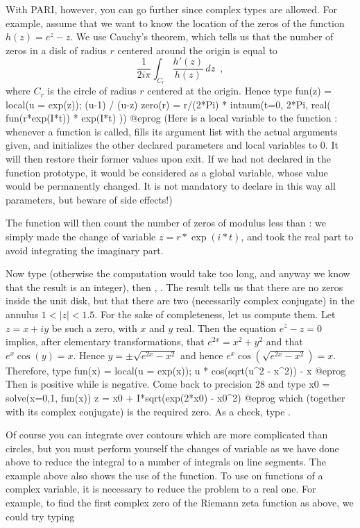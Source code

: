 With PARI, however, you can go further since complex types are allowed.
For example, assume that we want to know the location of the zeros of the
function $h(z)=e^z-z$. We use Cauchy's theorem, which tells us that the
number of zeros in a disk of radius $r$ centered around the origin is
equal to
$$\dfrac{1}{2i\pi}\int_{C_r}\dfrac{h'(z)}{h(z)}\,dz\enspace,$$
where $C_r$ is the circle of radius $r$ centered at the origin.
Hence type
\bprog
  fun(z) = local(u = exp(z)); (u-1) / (u-z)
  zero(r) = r/(2*Pi) * intnum(t=0, 2*Pi, real( fun(r*exp(I*t)) * exp(I*t) ))
@eprog\noindent
(Here  is a local variable to the function : whenever
a function is called,  fills its argument list with the actual arguments
given, and initializes the other declared parameters and local variables to
0. It will then restore their former values upon exit. If we had not declared
 in the function prototype, it would be considered as a global
variable, whose value would be permanently changed. It is not mandatory to
declare in this way all parameters, but beware of side effects!)

The function  will then count the number of zeros of modulus
less than : we simply made the change of variable $z = r*\exp(i*t)$,
and took the real part to avoid integrating the imaginary part.

Now type  (otherwise the computation would take too long, and
anyway we know that the result is an integer), then ,
. The result tells us that there are no zeros inside the unit
disk, but that there are two (necessarily complex conjugate) in the
annulus $1<|z|<1.5$. For the sake of completeness, let us compute them. Let
$z = x+iy$ be such a zero, with $x$ and $y$ real. Then the equation $e^z-z=0$
implies, after elementary transformations, that $e^{2x}=x^2+y^2$ and that
$e^x\cos(y)=x$. Hence $y=\pm\sqrt{e^{2x}-x^2}$ and hence
$e^x\cos(\sqrt{e^{2x}-x^2})=x$. Therefore, type
\bprog
  fun(x) = local(u = exp(x)); u * cos(sqrt(u^2 - x^2)) - x
@eprog\noindent
Then  is positive while  is negative. Come
back to precision 28 and type
\bprog
  x0 = solve(x=0,1, fun(x))
  z = x0 + I*sqrt(exp(2*x0) - x0^2)
@eprog\noindent
which (together with its complex conjugate) is the required zero.
As a check, type .

Of course you can integrate over contours which are more complicated than
circles, but you must perform yourself the changes of variable as we have
done above to reduce the integral to a number of integrals on line segments.
\smallskip
%
The example above also shows the use of the  function. To use
 on functions of a complex variable, it is necessary to reduce the
problem to a real one. For example, to find the first complex zero of the
Riemann zeta function as above, we could try typing

